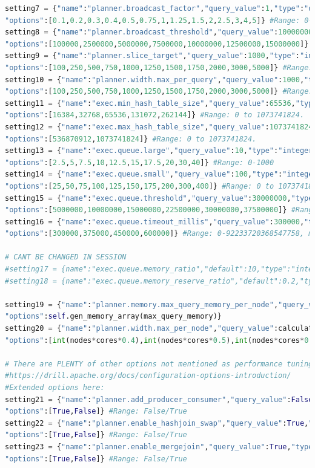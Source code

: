 \documentclass[a4paper,english]{report}
\begin{document}
\begin{lstlisting}[language=Python, caption=class\_definition.py\, the file defining all the algorithmic operations done during a optimization process.]
setting7 = {"name":"planner.broadcast_factor","query_value":1,"type":"double",
"options":[0.1,0.2,0.3,0.4,0.5,0.75,1,1.25,1.5,2,2.5,3,4,5]} #Range: 0-17976931348623157e+308
setting8 = {"name":"planner.broadcast_threshold","query_value":10000000,"type":"integer",
"options":[100000,2500000,5000000,7500000,10000000,12500000,15000000]} #Range: 0-2147483647
setting9 = {"name":"planner.slice_target","query_value":1000,"type":"integer",
"options":[100,250,500,750,1000,1250,1500,1750,2000,3000,5000]} #Range: integer
setting10 = {"name":"planner.width.max_per_query","query_value":1000,"type":"integer",
"options":[100,250,500,750,1000,1250,1500,1750,2000,3000,5000]} #Range: integer. note, only on big clusters
setting11 = {"name":"exec.min_hash_table_size","query_value":65536,"type":"integer",
"options":[16384,32768,65536,131072,262144]} #Range: 0 to 1073741824.
setting12 = {"name":"exec.max_hash_table_size","query_value":1073741824,"type":"integer",
"options":[536870912,1073741824]} #Range: 0 to 1073741824.
setting13 = {"name":"exec.queue.large","query_value":10,"type":"integer",
"options":[2.5,5,7.5,10,12.5,15,17.5,20,30,40]} #Range: 0-1000
setting14 = {"name":"exec.queue.small","query_value":100,"type":"integer",
"options":[25,50,75,100,125,150,175,200,300,400]} #Range: 0 to 1073741824.
setting15 = {"name":"exec.queue.threshold","query_value":30000000,"type":"integer",
"options":[5000000,10000000,15000000,22500000,30000000,37500000]} #Range: 0-9223372036854775807
setting16 = {"name":"exec.queue.timeout_millis","query_value":300000,"type":"integer",
"options":[300000,375000,450000,600000]} #Range: 0-92233720368547758, making this lower is a liability in this pyodbc setup.

# CANT BE CHANGED IN SESSION
#setting17 = {name":"exec.queue.memory_ratio","default":10,"type":"integer","options":[True,False]} #Range: integer 
#setting18 = {name":"exec.queue.memory_reserve_ratio","default":0.2,"type":"double","options":[True,False]} #Range: 0-1

setting19 = {"name":"planner.memory.max_query_memory_per_node","query_value": max_query_memory,"type":"integer",
"options":self.gen_memory_array(max_query_memory)}
setting20 = {"name":"planner.width.max_per_node","query_value":calculated,"type":"integer",
"options":[int(nodes*cores*0.4),int(nodes*cores*0.5),int(nodes*cores*0.6),int(nodes*cores*0.7),int(nodes*cores*0.8)]}

# There are PLENTY of other options not mentioned as performance tuning variables here
#https://drill.apache.org/docs/configuration-options-introduction/
#Extended options here:
setting21 = {"name":"planner.add_producer_consumer","query_value":False,"type":"boolean",
"options":[True,False]} #Range: False/True
setting22 = {"name":"planner.enable_hashjoin_swap","query_value":True,"type":"boolean",
"options":[True,False]} #Range: False/True
setting23 = {"name":"planner.enable_mergejoin","query_value":True,"type":"boolean",
"options":[True,False]} #Range: False/True


\end{lstlisting}
\end{document}
